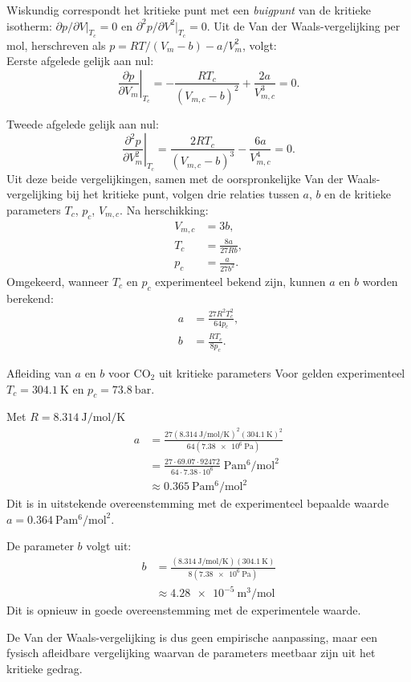 Wiskundig correspondt het kritieke punt met een \emph{buigpunt} van de kritieke isotherm: $\partial p/\partial V|_{T_c} = 0$ en $\partial^2 p/\partial V^2|_{T_c} = 0$. Uit de Van der Waals-vergelijking per mol, herschreven als $p = RT/(V_m - b) - a/V_m^2$, volgt:\\

Eerste afgelede gelijk aan nul:
\begin{equation*}
\left.\frac{\partial p}{\partial V_m}\right|_{T_c} = -\frac{RT_c}{(V_{m,c} - b)^2} + \frac{2a}{V_{m,c}^3} = 0.
\end{equation*}

Tweede afgelede gelijk aan nul:
\begin{equation*}
\left.\frac{\partial^2 p}{\partial V_m^2}\right|_{T_c} = \frac{2RT_c}{(V_{m,c} - b)^3} - \frac{6a}{V_{m,c}^4} = 0.
\end{equation*}
Uit deze beide vergelijkingen, samen met de oorspronkelijke Van der Waals-vergelijking bij het kritieke punt, volgen drie relaties tussen $a$, $b$ en de kritieke parameters $T_c$, $p_c$, $V_{m,c}$. Na herschikking:
\begin{align}
V_{m,c} &= 3b, \\
T_c &= \frac{8a}{27Rb}, \\
p_c &= \frac{a}{27b^2}.
\end{align}
Omgekeerd, wanneer $T_c$ en $p_c$ experimenteel bekend zijn, kunnen $a$ en $b$ worden berekend:
\begin{align}
a &= \frac{27 R^2 T_c^2}{64 p_c}, \\
b &= \frac{R T_c}{8 p_c}.
\end{align}

\begin{voorbeeld}{Afleiding van $a$ en $b$ voor $\mathrm{CO_2}$ uit kritieke parameters}
Voor  gelden experimenteel $T_c = \SI{304.1}{\kelvin}$ en $p_c = \SI{73.8}{\bar}$. 

Met $R = \SI{8.314}{\joule\per\mole\per\kelvin}$
\begin{align*}
a &= \frac{27(\SI{8.314}{\joule\per\mole\per\kelvin})^2(\SI{304.1}{\kelvin})^2}{64(\SI{7.38e6}{\pascal})} \\
  &= \frac{27 \cdot 69.07 \cdot 92472}{64 \cdot 7.38 \cdot 10^6}\;\si{\pascal\metre\tothe{6}\per\mole\squared} \\
  &\approx \SI{0.365}{\pascal\metre\tothe{6}\per\mole\squared}
\end{align*}
Dit is in uitstekende overeenstemming met de experimenteel bepaalde waarde $a = \SI{0.364}{\pascal\metre\tothe{6}\per\mole\squared}$. 

De parameter $b$ volgt uit:
\begin{align*}
b &= \frac{(\SI{8.314}{\joule\per\mole\per\kelvin})(\SI{304.1}{\kelvin})}{8(\SI{7.38e6}{\pascal})} \\
&\approx \SI{4.28e-5}{\metre\cubed\per\mole}
\end{align*}
Dit is opnieuw in goede overeenstemming met de experimentele waarde. 

De Van der Waals-vergelijking is dus geen empirische aanpassing, maar een fysisch afleidbare vergelijking waarvan de parameters meetbaar zijn uit het kritieke gedrag.
\end{voorbeeld}

